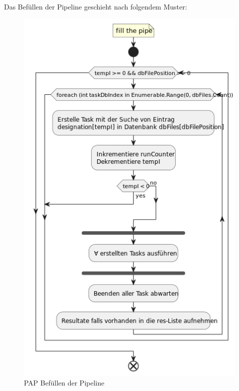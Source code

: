     Das Befüllen der Pipeline geschieht nach folgendem Muster:
    \begin{figure}[H]
        \centering
        \includegraphics[width=\textwidth]{../pap/Case_A.png}
        \caption{\ac{PAP} Befüllen der Pipeline}
        \label{png:case_a}
    \end{figure}

